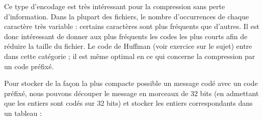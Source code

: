 

Ce type d'encodage est très intéressant pour la compression sans perte d'information. Dans la plupart des fichiers, le nombre d'occurrences de chaque caractère très variable : certains caractères sont plus fréquents que d'autres. Il est donc intéressant de donner aux plus fréquents les codes les plus courts afin de réduire la taille du fichier. Le code de Huffman (voir exercice sur le sujet) entre dans cette catégorie ; il est même optimal en ce qui concerne la compression par un code préfixé.
\medskip

Pour stocker de la façon la plus compacte possible un message codé avec un code préfixé, nous pouvons découper le message en morceaux de 32 bits (en admettant que les entiers sont codés sur 32 bits) et stocker les entiers correspondants dans un tableau :



\Fin
